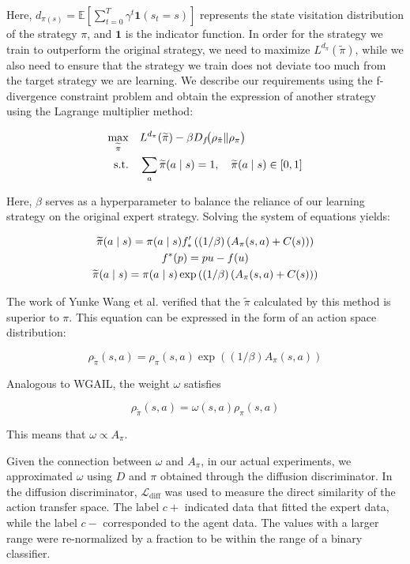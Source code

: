 \documentclass[lettersize,journal]{IEEEtran}
\begin{document}
Here, $d_{\pi(s)}=\mathbb{E}[\sum_{t=0}^{T} \gamma^t \mathbf{1}(s_t=s)]$ represents the state visitation distribution of the strategy $\pi$, and $\mathbf{1}$ is the indicator function.
In order for the strategy we train to outperform the original strategy, we need to maximize $L^{d_\pi}\left(\widetilde{\pi}\right)$, while we also need to ensure that the strategy we train does not deviate too much from the target strategy we are learning. We describe our requirements using the f-divergence constraint problem and obtain the expression of another strategy using the Lagrange multiplier method:

\begin{align}
\max_{\widetilde{\pi}}\quad & L^{d_{\pi}}(\widetilde{\pi}) - \beta D_{f}\!\big(\rho_{\tilde{\pi}}\|\rho_{\pi}\big) \\
	\text{s.t.}\quad & \sum_{a}\widetilde{\pi}(a\mid s)=1,\quad \widetilde{\pi}(a\mid s)\in[0,1] \notag
\end{align}

Here, $\beta$ serves as a hyperparameter to balance the reliance of our learning strategy on the original expert strategy. Solving the system of equations yields:


\begin{gather}
\widetilde{\pi}(a \mid s)=\pi(a \mid s) f_{*}^{\prime}\left((1 / \beta)\left(A_{\pi}(s, a)+C(s)\right)\right)\notag \\
f^{*}(p)=p u-f(u)\notag \\
\widetilde{\pi}(a \mid s)=\pi(a \mid s) \exp \left((1 / \beta)\left(A_{\pi}(s, a)+C(s)\right)\right)
\end{gather}

The work of Yunke Wang et al. verified that the $\widetilde{\pi} $ calculated by this method is superior to $\pi$. This equation can be expressed in the form of an action space distribution:

\begin{equation}
\rho_{\widetilde{\pi}}(s, a)=\rho_{\pi}(s, a) \exp \left((1 / \beta)A_{\pi}(s, a)\right)
\end{equation}

Analogous to WGAIL, the weight $\omega$ satisfies

\begin{equation}
  \rho_{\widetilde{\pi}}(s, a)= \omega(s, a)\rho_{\pi}(s, a) 
\end{equation}

This means that $\omega \propto A_\pi$.

Given the connection between $\omega$ and $A_\pi$, in our actual experiments, we approximated $\omega$ using $D$ and $\pi$ obtained through the diffusion discriminator. In the diffusion discriminator, $\mathcal{L}_{\text{diff}}$ was used to measure the direct similarity of the action transfer space. The label $c+$ indicated data that fitted the expert data, while the label $c-$ corresponded to the agent data. The values with a larger range were re-normalized by a fraction to be within the range of a binary classifier.
\end{document}
